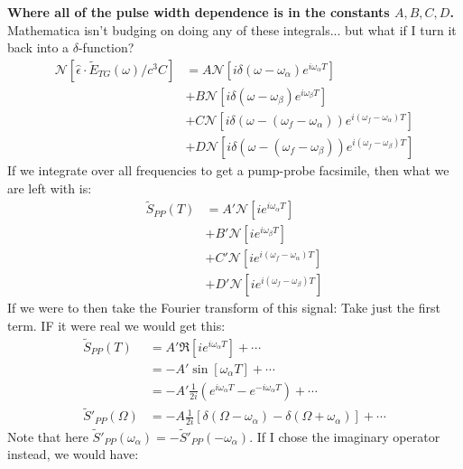 \textbf{Where all of the pulse width dependence is in the constants $A,B,C,D$.}  Mathematica isn't budging on doing any of these integrals... but what if I turn it back into a $\delta$-function?
\begin{align*}
	\mathcal{N} \left[\hat{\epsilon} \cdot \tilde{E}_{TG} (\omega) / c^3 C\right] &= A \mathcal{N}  \left[ i   \delta \left( \omega - \omega_{\alpha}\right)  e^{i \omega_{\alpha} T}   \right] \\
	&+  B  \mathcal{N} \left[i  \delta \left( \omega - \omega_{\beta}\right)  e^{i \omega_{\beta} T }   \right] \\
	&+  C  \mathcal{N} \left[i    \delta \left( \omega - \left(  \omega_f - \omega_{\alpha}\right) \right) e^{i \left(  \omega_f - \omega_{\alpha}\right) T }   \right] \\
	&+  D  \mathcal{N} \left[i     \delta \left( \omega -  \left(  \omega_f - \omega_{\beta}\right)\right) e^{i  \left(  \omega_f - \omega_{\beta}\right) T }   \right]
\end{align*}
If we integrate over all frequencies to get a pump-probe facsimile, then what we are left with is:
\begin{align}
	\tilde{S}_{PP}(T) &= A' \mathcal{N}  \left[ i   e^{i \omega_{\alpha} T}   \right] \\
	&+  B'  \mathcal{N} \left[i    e^{i \omega_{\beta} T }   \right] \\
	&+  C'  \mathcal{N} \left[i    e^{i \left(  \omega_f - \omega_{\alpha}\right) T }   \right] \\
	&+  D'  \mathcal{N} \left[i    e^{i  \left(  \omega_f - \omega_{\beta}\right) T }   \right]
\end{align}
If we were to then take the Fourier transform of this signal:
Take just the first term.  IF it were real we would get this:
\begin{align}
	\tilde{S}_{PP}(T) &= A' \Re  \left[ i   e^{i \omega_{\alpha} T}   \right] + \cdots \\
	&= -A' \sin  \left[ \omega_{\alpha} T   \right] + \cdots \\
	&= -A' \frac{1}{2i} \left(  e^{i \omega_{\alpha} T  }  - e^{-i \omega_{\alpha} T  } \right) + \cdots \\
	\tilde{S}'_{PP}(\Omega) &= -A \frac{1}{2i}  \left[  \delta  \left( \Omega - \omega_{\alpha} \right)  - \delta  \left( \Omega + \omega_{\alpha} \right)   \right] + \cdots
\end{align}
Note that here $\tilde{S}'_{PP}(\omega_{\alpha})  = - \tilde{S}'_{PP}(-\omega_{\alpha})  $.  If I chose the imaginary operator instead, we would have:
